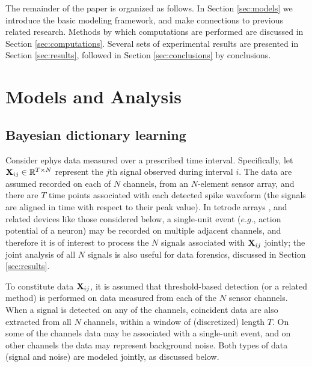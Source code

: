 \documentclass[journal]{IEEEtran}
\begin{document}
The remainder of the paper is organized as follows. In Section \ref{sec:models} we introduce the basic modeling framework, and make connections to previous related research. Methods by which computations are performed are discussed in Section \ref{sec:computations}.
Several sets of experimental results are presented in Section \ref{sec:results}, followed in Section \ref{sec:conclusions} by conclusions.

\section{Models and Analysis\label{sec:models}}

\subsection{Bayesian dictionary learning\label{sec:dict}}

Consider ephys data measured over a prescribed time interval. Specifically, let ${\mathbf X}_{ij}\in\mathbb{R}^{T\times N}$ represent the $j$th signal observed during interval $i$. The data are assumed recorded on each of $N$ channels, from an $N$-element sensor array, and there are $T$ time points associated with each detected spike waveform (the signals are aligned in time with respect to their peak value). In tetrode arrays \cite{tetrode}, and related devices like those considered below, a single-unit event ($e.g.$, action potential of a neuron) may be recorded on multiple adjacent channels, and therefore it is of interest to process the $N$ signals associated with ${\mathbf X}_{ij}$ jointly; the joint analysis of all $N$ signals is also useful for data forensics, discussed in Section \ref{sec:results}.

To constitute data ${\mathbf X}_{ij}$, it is assumed that threshold-based detection (or a related method) is performed on data measured from each of the $N$ sensor channels. When a signal is detected on any of the channels, coincident data are also extracted from all $N$ channels, within a window of (discretized) length $T$. On some of the channels data may be associated with a single-unit event, and on other channels the data may represent background noise. Both types of data (signal and noise) are modeled jointly, as discussed below.
\end{document}
